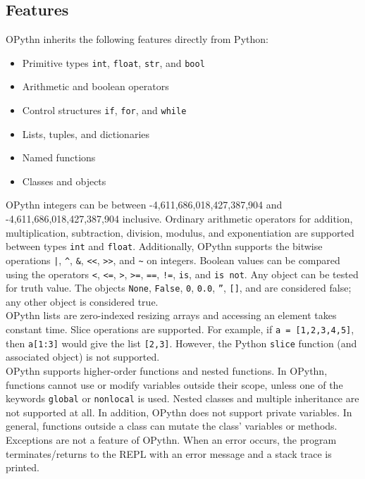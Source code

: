 \documentclass[11pt, twoside]{article}
\newcommand{\ms}{\texttt}
\begin{document}
    \subsection{Features}
    OPythn inherits the following features directly from Python:
    \begin{itemize}
        \item Primitive types \ms{int}, \ms{float}, \ms{str}, and \ms{bool}
        \item Arithmetic and boolean operators
        \item Control structures \ms{if}, \ms{for}, and \ms{while}
        \item Lists, tuples, and dictionaries
        \item Named functions
        \item Classes and objects
    \end{itemize}
    OPythn integers can be between -4,611,686,018,427,387,904 and -4,611,686,018,427,387,904 inclusive. Ordinary arithmetic operators for addition, multiplication, subtraction, division, modulus, and exponentiation are supported between types \ms{int} and \ms{float}. Additionally, OPythn supports the bitwise operations \ms{|}, \ms{\^}, \ms{\&}, \ms{<<}, \ms{>>}, and \ms{\~} on integers. Boolean values can be compared using the operators \ms{<}, \ms{<=}, \ms{>}, \ms{>=}, \ms{==}, \ms{!=}, \ms{is}, and \ms{is not}. Any object can be tested for truth value. The objects \ms{None}, \ms{False}, \ms{0}, \ms{0.0}, \ms{''}, \ms{[]}, and \ms{\string{\string}} are considered false; any other object is considered true.\\
    \indent OPythn lists are zero-indexed resizing arrays and accessing an element takes constant time. Slice operations are supported. For example, if \ms{a = [1,2,3,4,5]}, then \ms{a[1:3]} would give the list \ms{[2,3]}. However, the Python \ms{slice} function (and associated object) is not supported. \\
    \indent OPythn supports higher-order functions and nested functions. In OPythn, functions cannot use or modify variables outside their scope, unless one of the keywords \ms{global} or \ms{nonlocal} is used. Nested classes and multiple inheritance are not supported at all. In addition, OPythn does not support private variables. In general, functions outside a class can mutate the class' variables or methods. Exceptions are not a feature of OPythn. When an error occurs, the program terminates/returns to the REPL with an error message and a stack trace is printed.\\
\end{document}
